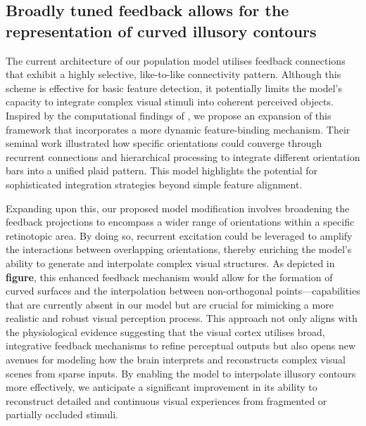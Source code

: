 \documentclass[12pt]{article}
\begin{document}

\subsection{Broadly tuned feedback allows for the representation of curved illusory contours}
The current architecture of our population model utilises feedback connections that exhibit a highly selective, like-to-like connectivity pattern. Although this scheme is effective for basic feature detection, it potentially limits the model's capacity to integrate complex visual stimuli into coherent perceived objects. Inspired by the computational findings of \textcite{muirSpecificExcitatoryConnectivity2017}, we propose an expansion of this framework that incorporates a more dynamic feature-binding mechanism. Their seminal work illustrated how specific orientations could converge through recurrent connections and hierarchical processing to integrate different orientation bars into a unified plaid pattern. This model highlights the potential for sophisticated integration strategies beyond simple feature alignment.

Expanding upon this, our proposed model modification involves broadening the feedback projections to encompass a wider range of orientations within a specific retinotopic area. By doing so, recurrent excitation could be leveraged to amplify the interactions between overlapping orientations, thereby enriching the model’s ability to generate and interpolate complex visual structures. As depicted in \textbf{figure}, this enhanced feedback mechanism would allow for the formation of curved surfaces and the interpolation between non-orthogonal points—capabilities that are currently absent in our model but are crucial for mimicking a more realistic and robust visual perception process. This approach not only aligns with the physiological evidence suggesting that the visual cortex utilises broad, integrative feedback mechanisms to refine perceptual outputs but also opens new avenues for modeling how the brain interprets and reconstructs complex visual scenes from sparse inputs. By enabling the model to interpolate illusory contours more effectively, we anticipate a significant improvement in its ability to reconstruct detailed and continuous visual experiences from fragmented or partially occluded stimuli. 
\end{document}
